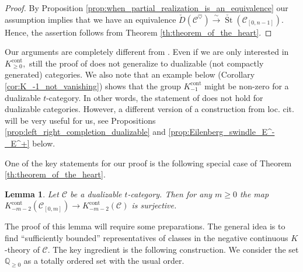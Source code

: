 \documentclass[11pt,leqno]{amsart}
\newtheorem{lemma}[theo]{Lemma}
\numberwithin{equation}{section}
\def\Q{\mathbb{Q}}
\newcommand{\xto}{\xrightarrow}
\newcommand{\cont}{\operatorname{cont}}
\newcommand{\St}{\operatorname{St}}
\newcommand{\cC}{{\mathcal C}}
\begin{document}
 \begin{proof}
 By Proposition \ref{prop:when_partial_realization_is_an_equivalence} our assumption implies that we have an equivalence $\check{D}(\cC^{\heartsuit})\xto{\sim}\check{\St}(\cC_{[0,n-1]}).$ Hence, the assertion follows from Theorem \ref{th:theorem_of_the_heart}.
 \end{proof}



Our arguments are completely different from \cite{Bar15}. Even if we are only interested in $K_{\geq 0}^{\cont},$ still the proof of \cite[Theorem 6.1]{Bar15} does not generalize to dualizable (not compactly generated) categories. We also note that an example below (Corollary \ref{cor:K_-1_not_vanishing}) shows that the group $K_{-1}^{\cont}$ might be non-zero for a dualizable $t$-category. In other words, the statement of \cite[Theorem 2.35]{AGH19} does not hold for dualizable categories. However, a different version of a construction from loc. cit. will be very useful for us, see Propositions \ref{prop:left_right_completion_dualizable} and \ref{prop:Eilenberg_swindle_E^-_E^+} below.

One of the key statements for our proof is the following special case of Theorem \ref{th:theorem_of_the_heart}.

\begin{lemma}\label{lem:key_surjectivity_on_K_-m-2}
Let $\cC$ be a dualizable $t$-category. Then for any $m\geq 0$ the map $K_{-m-2}^{\cont}(\cC_{[0,m]})\to K_{-m-2}^{\cont}(\cC)$ is surjective.
\end{lemma}

The proof of this lemma will require some preparations. The general idea is to find ``sufficiently bounded'' representatives of classes in the negative continuous $K$-theory of $\cC.$ The key ingredient is the following construction.
We consider the set $\Q_{\geq 0}$ as a totally ordered set with the usual order.
\end{document}

